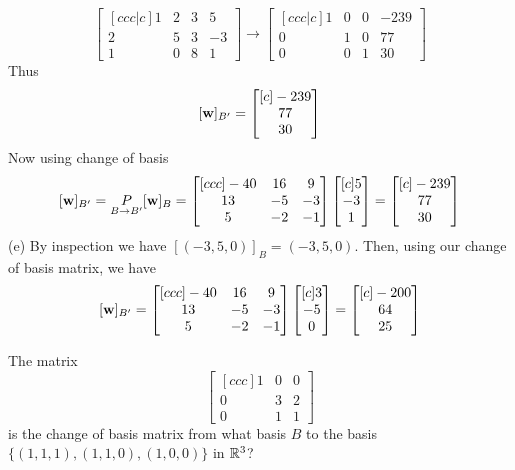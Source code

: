 \begin{solution}
$$
\begin{bmatrix}[ccc|c]
1&2&3&5\\
2&5&3&-3\\
1&0&8&1
\end{bmatrix}
\rightarrow
\begin{bmatrix}[ccc|c]
1&0&0&-239\\
0&1&0&77\\
0&0&1&30
\end{bmatrix}
$$
Thus 
$$
[{\mathbf w}]_{B'} =
\begin{bmatrix}[c]
-239\\
77\\
30
\end{bmatrix}
$$
Now using change of basis
$$
[{\mathbf w}]_{B'} =\underset{B\rightarrow B'}{P}[{\mathbf w}]_B=
\begin{bmatrix}[ccc]
-40&16&9\\
13&-5&-3\\
5&-2&-1
\end{bmatrix}
\begin{bmatrix}[c]
5\\
-3\\
1
\end{bmatrix}=
\begin{bmatrix}[c]
-239\\
77\\
30
\end{bmatrix}
$$
(e) By inspection we have $[(-3,5,0)]_B=(-3,5,0)$. Then, using our change of basis matrix, we have 
$$
[{\mathbf w}]_{B'} =
\begin{bmatrix}[ccc]
-40&16&9\\
13&-5&-3\\
5&-2&-1
\end{bmatrix}
\begin{bmatrix}[c]
3\\
-5\\
0
\end{bmatrix}=
\begin{bmatrix}[c]
-200\\
64\\
25
\end{bmatrix}
$$
\end{solution}
\ii The matrix
$$
\begin{bmatrix}[ccc]
1&0&0\\
0&3&2\\
0&1&1
\end{bmatrix}
$$
is the change of basis matrix from what basis $B$ to the basis $\{(1,1,1),(1,1,0),(1,0,0)\}$ in ${\mathbb R}^3$?
\\
